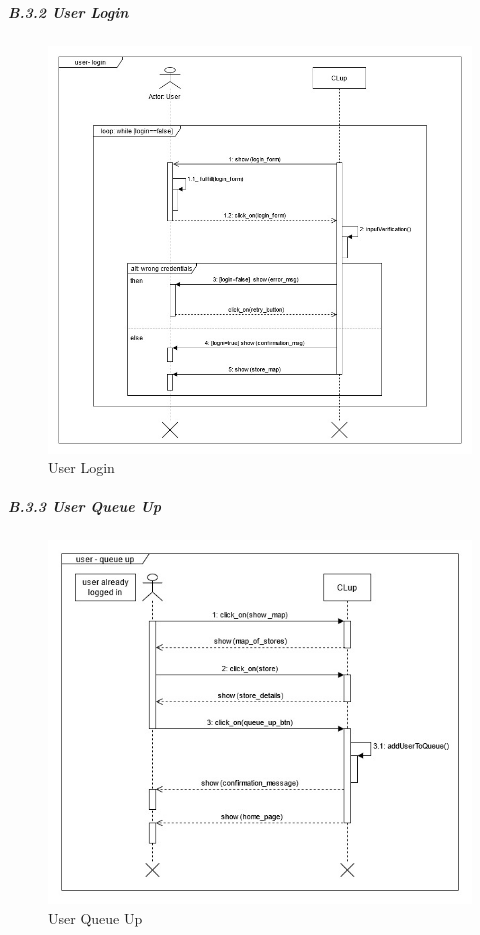 \documentclass[
]{article}
\begin{document}
\hypertarget{b.3.2-user-login}{%
\subparagraph{\texorpdfstring{B.3.2 User Login
}{B.3.2 User Login }}\label{b.3.2-user-login}}

\begin{figure}
\centering
\includegraphics{assets/rasd/sequence_diagrams/sequence_diagram_user_login.jpg}
\caption{User Login}
\end{figure}

\hypertarget{b.3.3-user-queue-up}{%
\subparagraph{\texorpdfstring{B.3.3 User Queue Up
}{B.3.3 User Queue Up }}\label{b.3.3-user-queue-up}}

\begin{figure}
\centering
\includegraphics{assets/rasd/sequence_diagrams/sequence_diagram_user_queue_up.jpg}
\caption{User Queue Up}
\end{figure}
\end{document}
